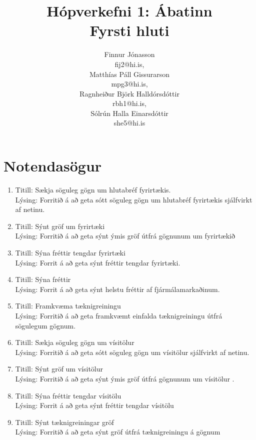 \documentclass[a4,12pt]{article}
\author{
Finnur Jónasson\\ fij2@hi.is,\\
Matthías Páll Gissurarson\\ mpg3@hi.is,\\
Ragnheiður Björk Halldórsdóttir\\ rbh1@hi.is,\\
Sólrún Halla Einarsdóttir\\ she5@hi.is
}
\title{Hópverkefni 1: Ábatinn\\
Fyrsti hluti}
\begin{document}
\maketitle

\section{Notendasögur}

\begin{enumerate}[]
\item Titill: Sækja söguleg gögn um hlutabréf fyrirtækis.\\
Lýsing: Forritið á að geta sótt söguleg gögn um hlutabréf fyrirtækis sjálfvirkt af netinu.

\item Titill: Sýnt gröf um fyrirtæki\\
Lýsing: Forritið á að geta sýnt ýmis gröf útfrá gögnunum um fyrirtækið

\item Titill: Sýna fréttir tengdar fyrirtæki\\
Lýsing: Forrit á að geta sýnt fréttir tengdar fyrirtæki.

\item Titill: Sýna fréttir\\
Lýsing: Forrit á að geta sýnt helstu fréttir af fjármálamarkaðinum.

\item Titill: Framkvæma tæknigreiningu\\
Lýsing: Forritið á að geta framkvæmt einfalda tæknigreiningu útfrá sögulegum gögnum.

\item Titill: Sækja söguleg gögn um vísitölur\\
Lýsing: Forritið á að geta sótt söguleg gögn um vísitölur sjálfvirkt af netinu.

\item Titill: Sýnt gröf um vísitölur\\
Lýsing: Forritið á að geta sýnt ýmis gröf útfrá gögnunum um vísitölur .

\item Titill: Sýna fréttir tengdar vísitölu \\
Lýsing: Forrit á að geta sýnt fréttir tengdar vísitölu 

\item Titill: Sýnt tæknigreiningar gröf\\
Lýsing: Forritið á að geta sýnt gröf útfrá tæknigreiningu á gögnum


\end{enumerate}
\end{document}
